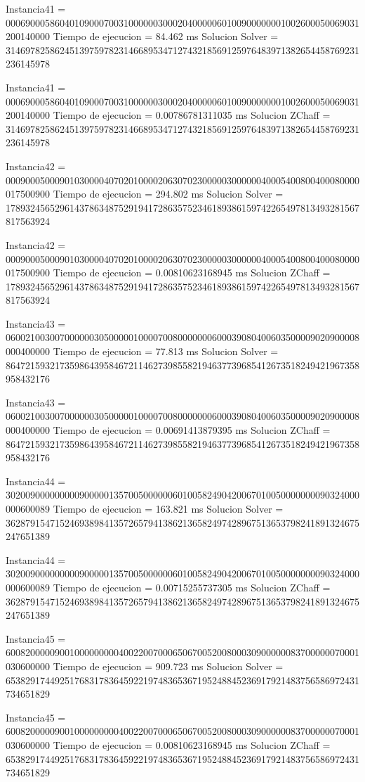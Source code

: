 Instancia41 = 000690005860401090007003100000030002040000060100900000001002600050069031200140000
Tiempo de ejecucion = 84.462 ms
Solucion Solver = 314697825862451397597823146689534712743218569125976483971382654458769231236145978

Instancia41 = 000690005860401090007003100000030002040000060100900000001002600050069031200140000
Tiempo de ejecucion = 0.00786781311035 ms
Solucion ZChaff = 314697825862451397597823146689534712743218569125976483971382654458769231236145978

Instancia42 = 000900050009010300004070201000020630702300000300000040005400800400080000017500900
Tiempo de ejecucion = 294.802 ms
Solucion Solver = 178932456529614378634875291941728635752346189386159742265497813493281567817563924

Instancia42 = 000900050009010300004070201000020630702300000300000040005400800400080000017500900
Tiempo de ejecucion = 0.00810623168945 ms
Solucion ZChaff = 178932456529614378634875291941728635752346189386159742265497813493281567817563924

Instancia43 = 060021003007000000305000001000070080000000600039080400603500009020900008000400000
Tiempo de ejecucion = 77.813 ms
Solucion Solver = 864721593217359864395846721146273985582194637739685412673518249421967358958432176

Instancia43 = 060021003007000000305000001000070080000000600039080400603500009020900008000400000
Tiempo de ejecucion = 0.00691413879395 ms
Solucion ZChaff = 864721593217359864395846721146273985582194637739685412673518249421967358958432176

Instancia44 = 302009000000000900000135700500000060100582490420067010050000000090324000000600089
Tiempo de ejecucion = 163.821 ms
Solucion Solver = 362879154715246938984135726579413862136582497428967513653798241891324675247651389

Instancia44 = 302009000000000900000135700500000060100582490420067010050000000090324000000600089
Tiempo de ejecucion = 0.00715255737305 ms
Solucion ZChaff = 362879154715246938984135726579413862136582497428967513653798241891324675247651389

Instancia45 = 600820000090010000000004002200700065067005200800030900000083700000070001030600000
Tiempo de ejecucion = 909.723 ms
Solucion Solver = 653829174492517683178364592219748365367195248845236917921483756586972431734651829

Instancia45 = 600820000090010000000004002200700065067005200800030900000083700000070001030600000
Tiempo de ejecucion = 0.00810623168945 ms
Solucion ZChaff = 653829174492517683178364592219748365367195248845236917921483756586972431734651829

